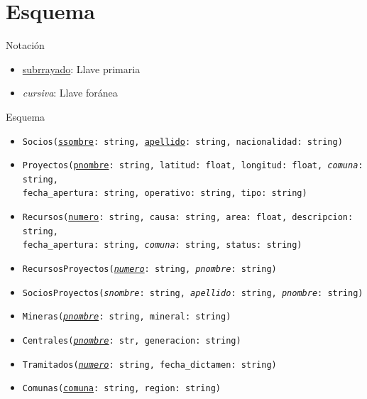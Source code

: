 \documentclass{article}
\begin{document}
\pagebreak

\section{Esquema}
Notación
	\begin{itemize}
		\item \underline{subrrayado}: Llave primaria
		\item \textit{cursiva}: Llave foránea
	\end{itemize}
Esquema

	\begin{itemize}
		\item \texttt{Socios(\underline{ssombre}: string, \underline{apellido}: string, nacionalidad: string)} 
		\item \texttt{Proyectos(\underline{pnombre}: string, latitud: float, longitud: float, \textit{comuna}: string,\\ fecha\_apertura: string, operativo: string, tipo: string)} 
		\item \texttt{Recursos(\underline{numero}: string, causa: string, area: float, descripcion: string,\\ fecha\_apertura: string, \textit{comuna}: string, status: string)}
		\item \texttt{RecursosProyectos(\underline{\textit{numero}}: string, \textit{pnombre}: string)} 
		
		\item \texttt{SociosProyectos(\textit{snombre}: string, \textit{apellido}: string, \textit{pnombre}: string)} 
		 
		\item \texttt{Mineras(\underline{\textit{pnombre}}: string, mineral: string)} 
		\item \texttt{Centrales(\underline{\textit{pnombre}}: str, generacion: string)} 
		\item \texttt{Tramitados(\underline{\textit{numero}}: string, fecha\_dictamen: string)} 
		
		\item \texttt{Comunas(\underline{comuna}: string, region: string)} 
	\end{itemize}
\end{document}
